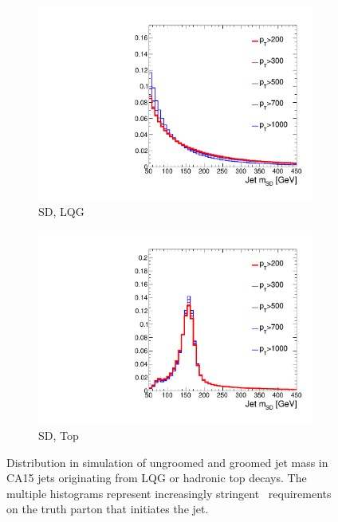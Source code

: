 \begin{figure}[]
\begin{center}
\begin{subfigure}[t]{0.35\textwidth}
            \includegraphics[width=\textwidth]{figures/toptagging/gen/norm_clf_MSD_QCD.pdf}
            \caption{SD, LQG}
        \end{subfigure}
        \begin{subfigure}[t]{0.35\textwidth}
            \includegraphics[width=\textwidth]{figures/toptagging/gen/norm_clf_MSD_ZpTT_lo.pdf}
            \caption{SD, Top}
        \end{subfigure}
        \caption{Distribution in simulation of ungroomed and groomed jet mass in CA15 jets originating from LQG or hadronic top decays.
                 The multiple histograms represent increasingly stringent \pt~requirements on the truth parton that initiates the jet.}
        \label{fig:jets:msd}
    \end{center}
\end{figure}

